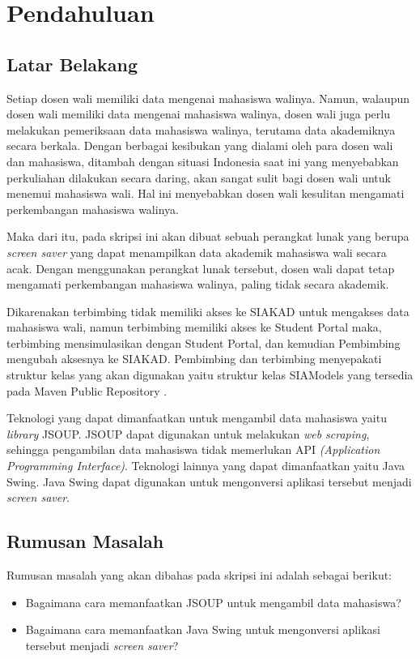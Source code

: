 \chapter{Pendahuluan}
\label{chap:intro}
   
\section{Latar Belakang}
\label{sec:label}

Setiap dosen wali memiliki data mengenai mahasiswa walinya. Namun, walaupun dosen wali memiliki data mengenai mahasiswa walinya, dosen wali juga perlu melakukan pemeriksaan data mahasiswa walinya, terutama data akademiknya secara berkala. Dengan berbagai kesibukan yang dialami oleh para dosen wali dan mahasiswa, ditambah dengan situasi Indonesia saat ini yang menyebabkan perkuliahan dilakukan secara daring, akan sangat sulit bagi dosen wali untuk menemui mahasiswa wali. Hal ini menyebabkan dosen wali kesulitan mengamati perkembangan mahasiswa walinya. 

Maka dari itu, pada skripsi ini akan dibuat sebuah perangkat lunak yang berupa \textit{screen saver} yang dapat menampilkan data akademik mahasiswa wali secara acak. Dengan menggunakan perangkat lunak tersebut, dosen wali dapat tetap mengamati perkembangan mahasiswa walinya, paling tidak secara akademik.

Dikarenakan terbimbing tidak memiliki akses ke SIAKAD untuk mengakses data mahasiswa wali, namun terbimbing memiliki akses ke Student Portal maka, terbimbing mensimulasikan dengan Student Portal, dan kemudian Pembimbing mengubah aksesnya ke SIAKAD. Pembimbing dan terbimbing menyepakati struktur kelas yang akan digunakan yaitu struktur kelas SIAModels yang tersedia pada Maven Public Repository \cite{siamodels}.

Teknologi yang dapat dimanfaatkan untuk mengambil data mahasiswa yaitu \textit{library} JSOUP. JSOUP dapat digunakan untuk melakukan \textit{web scraping}, sehingga pengambilan data mahasiswa tidak memerlukan API \textit{(Application Programming Interface)}. Teknologi lainnya yang dapat dimanfaatkan yaitu Java Swing. Java Swing dapat digunakan untuk mengonversi aplikasi tersebut menjadi \textit{screen saver}.



\section{Rumusan Masalah}
\label{sec:rumusan}
Rumusan masalah yang akan dibahas pada skripsi ini adalah sebagai berikut:
\begin{itemize}
	\item Bagaimana cara memanfaatkan JSOUP untuk mengambil data mahasiswa?
	\item Bagaimana cara memanfaatkan Java Swing untuk mengonversi aplikasi tersebut menjadi \textit{screen saver}?
\end{itemize}   

